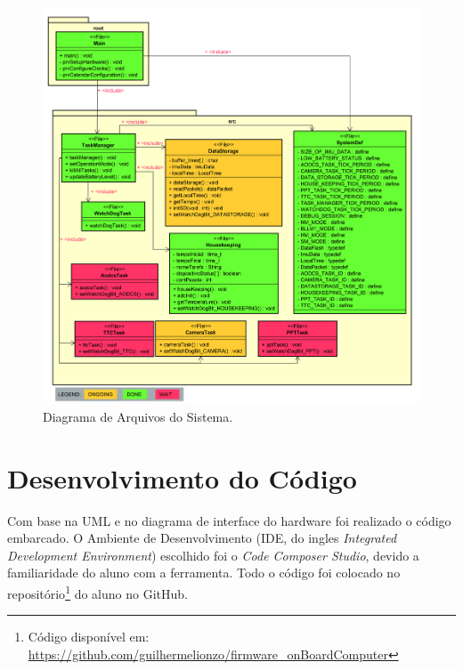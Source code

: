 \begin{itemize}
\begin{figure}[h]
		\includegraphics[keepaspectratio=true,scale=0.36]{figuras/CSS.png}
		\caption{Diagrama de Arquivos do Sistema.}
		\label{uml_da}
	\end{figure}
	\FloatBarrier

	
	
\end{itemize}

\newpage
\section{Desenvolvimento do Código}

Com base na UML e no diagrama de interface do hardware foi realizado o código embarcado. O Ambiente de Desenvolvimento (IDE, do ingles \textit{Integrated Development Environment}) escolhido foi o \textit{Code Composer Studio}, devido  a familiaridade do aluno com a ferramenta. Todo o código foi colocado no repositório\footnote{Código disponível em: \url{https://github.com/guilhermelionzo/firmware_onBoardComputer}} do aluno no GitHub. 

